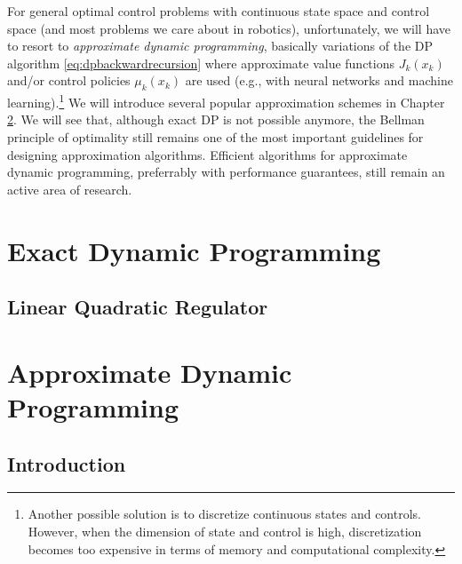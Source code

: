 \documentclass[
]{book}
\theoremstyle{definition}
\theoremstyle{definition}
\theoremstyle{definition}
\theoremstyle{definition}
\theoremstyle{remark}
\begin{document}
For general optimal control problems with continuous state space and control space (and most problems we care about in robotics), unfortunately, we will have to resort to \emph{approximate dynamic programming}, basically variations of the DP algorithm \eqref{eq:dpbackwardrecursion} where approximate value functions \(J_k(x_k)\) and/or control policies \(\mu_k(x_k)\) are used (e.g., with neural networks and machine learning).\footnote{Another possible solution is to discretize continuous states and controls. However, when the dimension of state and control is high, discretization becomes too expensive in terms of memory and computational complexity.} We will introduce several popular approximation schemes in Chapter \ref{approximatedp}. We will see that, although exact DP is not possible anymore, the Bellman principle of optimality still remains one of the most important guidelines for designing approximation algorithms. Efficient algorithms for approximate dynamic programming, preferrably with performance guarantees, still remain an active area of research.

\hypertarget{exactdp}{%
\chapter{Exact Dynamic Programming}\label{exactdp}}

\hypertarget{lqr}{%
\section{Linear Quadratic Regulator}\label{lqr}}

\hypertarget{approximatedp}{%
\chapter{Approximate Dynamic Programming}\label{approximatedp}}

\hypertarget{introduction}{%
\section{Introduction}\label{introduction}}
\end{document}
